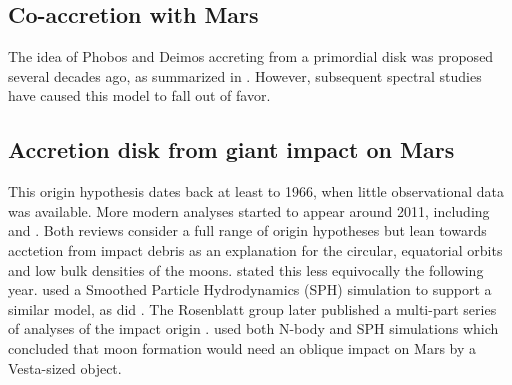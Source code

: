 
\subsection{Co-accretion with Mars}

The idea of Phobos and Deimos accreting from a primordial disk was proposed several decades ago, as summarized in \citet{burns_contradictory_1992}. However, subsequent spectral studies have caused this model to fall out of favor.

\subsection{Accretion disk from giant impact on Mars}

This origin hypothesis dates back at least to 1966, when little observational data was available. More modern analyses started to appear around 2011, including \citet{craddock_are_2011} and  \citet{rosenblatt_origin_2011}. Both reviews consider a full range of origin hypotheses but lean towards acctetion from impact debris as an explanation for the circular, equatorial orbits and low bulk densities of the moons.  \citet{rosenblatt_formation_2012} stated this less equivocally the following year. \citet{citron_formation_2015} used a Smoothed Particle Hydrodynamics (SPH) simulation to support a similar model, as did \citet{rosenblatt_accretion_2016}. The Rosenblatt group later published a multi-part series of analyses of the impact origin \citep{hyodo_impact_2017, hyodo_impact_2017-1, hyodo_impact_2018}. \citet{canup_origin_2018} used both N-body and SPH simulations which concluded that moon formation would need an oblique impact on Mars by a Vesta-sized object.



\newpage

{}

	
	



